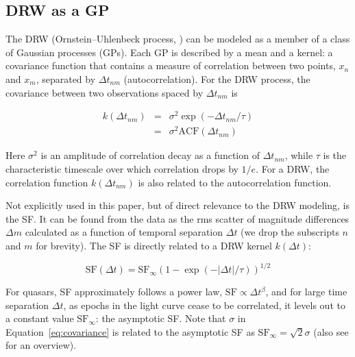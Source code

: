 \documentclass[twocolumn]{aastex62}
\begin{document}
\subsection{DRW as a GP}
The DRW (Ornstein--Uhlenbeck process, \citealt{rasmussen2006}) can be modeled as a member of a class of Gaussian processes (GPs). Each GP is described by a mean and a kernel: a covariance function that contains a measure of correlation between two points, $x_{n}$ and $x_{m}$, separated by $\Delta t_{nm}$ (autocorrelation). For the  DRW process, the covariance  between two observations spaced by  $\Delta t_{nm}$ is

\begin{eqnarray}
k(\Delta t_{nm}) &=& \sigma^{2}\exp{(-\Delta t_{nm} / \tau)}  \nonumber \\
                 &=& \sigma^{2} \mathrm{ACF}(\Delta t_{nm}) 
\label{eq:covariance}
\end{eqnarray} 

Here $\sigma^{2}$ is an amplitude of correlation decay as a function of $\Delta t_{nm}$,  while $\tau$ is the characteristic timescale over which correlation drops by $1/e$. For a DRW,  the correlation function $k(\Delta t_{nm})$ is also related to the autocorrelation function.

Not explicitly used in this paper, but of direct relevance to the DRW modeling, is the SF. It can be found from the data as the rms scatter of  magnitude differences $\Delta m$  calculated as a function of temporal separation $\Delta t$ (we drop the subscripts $n$ and $m$ for brevity). The SF is directly related to a DRW kernel $k(\Delta t)$:

\begin{equation}
\mathrm{SF}(\Delta t) = \mathrm{SF}_{\infty} (1-\exp{(-|\Delta t|/\tau)})^{1/2}
\end{equation}

For quasars, SF approximately follows  a power law, $\mathrm{SF} \propto \Delta t^{\beta}$,  and for large time separation $\Delta t$, as epochs in the light curve cease to be correlated, it levels out to a constant value $\mathrm{SF}_{\infty}$: the asymptotic SF.  Note that $\sigma$ in Equation~\ref{eq:covariance} is related to the asymptotic SF as $\mathrm{SF}_\infty = \sqrt{2} \sigma$ (also see \citet{bauer2009, macleod2012, graham2015a} for an overview).
\end{document}
